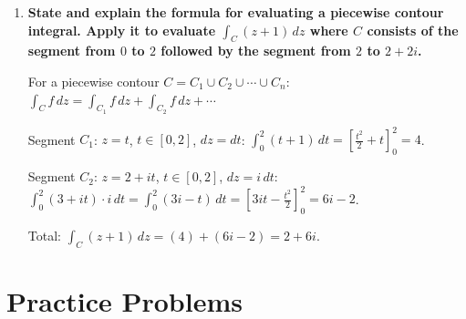 \documentclass[12pt,a4paper]{article}
\begin{document}
\begin{enumerate}[leftmargin=2em]
(a) $z(t)=t(1+i)$, $\operatorname{Re}(z)=t$, $dz=(1+i)\,dt$:
$\int_0^1 t(1+i)\,dt = \frac{1+i}{2}$.

(b) $z(t)=e^{it}$, $t\in[0,\pi/2]$, $\operatorname{Re}(z)=\cos t$, $dz=ie^{it}\,dt$:
$\int_0^{\pi/2}\cos t\cdot ie^{it}\,dt = \int_0^{\pi/2}\cos t(i\cos t - \sin t)\,dt$.
Computing: real part $-\int_0^{\pi/2}\cos t\sin t\,dt = -\frac{1}{4}$;
imaginary part $i\int_0^{\pi/2}\cos^2 t\,dt = \frac{\pi i}{4}$.
Result: $-\frac{1}{4}+\frac{\pi i}{4}$.

The two results differ, confirming path dependence for $\operatorname{Re}(z)$,
which is not analytic.

\item \textbf{State and explain the formula for evaluating a piecewise contour integral.
Apply it to evaluate $\int_C (z+1)\,dz$ where $C$ consists of the segment from
$0$ to $2$ followed by the segment from $2$ to $2+2i$.}

For a piecewise contour $C = C_1 \cup C_2 \cup \cdots \cup C_n$:
$\int_C f\,dz = \int_{C_1} f\,dz + \int_{C_2} f\,dz + \cdots$

Segment $C_1$: $z=t$, $t\in[0,2]$, $dz=dt$:
$\int_0^2(t+1)\,dt = \left[\frac{t^2}{2}+t\right]_0^2 = 4$.

Segment $C_2$: $z=2+it$, $t\in[0,2]$, $dz=i\,dt$:
$\int_0^2(3+it)\cdot i\,dt = \int_0^2(3i-t)\,dt
= \left[3it-\frac{t^2}{2}\right]_0^2 = 6i-2$.

Total: $\int_C(z+1)\,dz = (4)+(6i-2) = 2+6i$.

\end{enumerate}

\section{Practice Problems}
\end{document}
